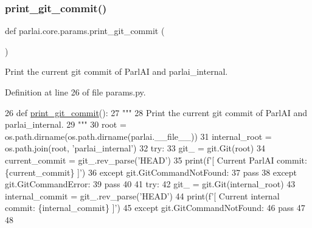 \mbox{\label{namespaceparlai_1_1core_1_1params_ac8624bf16ab6b2df0f2869f29a92c90b}} 
\subsubsection{\texorpdfstring{print\+\_\+git\+\_\+commit()}{print\_git\_commit()}}
{\footnotesize\ttfamily def parlai.\+core.\+params.\+print\+\_\+git\+\_\+commit (\begin{DoxyParamCaption}{ }\end{DoxyParamCaption})}

\begin{DoxyVerb}Print the current git commit of ParlAI and parlai_internal.
\end{DoxyVerb}
 

Definition at line 26 of file params.\+py.


\begin{DoxyCode}
26 \textcolor{keyword}{def }\hyperlink{namespaceparlai_1_1core_1_1params_ac8624bf16ab6b2df0f2869f29a92c90b}{print\_git\_commit}():
27     \textcolor{stringliteral}{"""}
28 \textcolor{stringliteral}{    Print the current git commit of ParlAI and parlai\_internal.}
29 \textcolor{stringliteral}{    """}
30     root = os.path.dirname(os.path.dirname(parlai.\_\_file\_\_))
31     internal\_root = os.path.join(root, \textcolor{stringliteral}{'parlai\_internal'})
32     \textcolor{keywordflow}{try}:
33         git\_ = git.Git(root)
34         current\_commit = git\_.rev\_parse(\textcolor{stringliteral}{'HEAD'})
35         print(f\textcolor{stringliteral}{'[ Current ParlAI commit: \{current\_commit\} ]'})
36     \textcolor{keywordflow}{except} git.GitCommandNotFound:
37         \textcolor{keywordflow}{pass}
38     \textcolor{keywordflow}{except} git.GitCommandError:
39         \textcolor{keywordflow}{pass}
40 
41     \textcolor{keywordflow}{try}:
42         git\_ = git.Git(internal\_root)
43         internal\_commit = git\_.rev\_parse(\textcolor{stringliteral}{'HEAD'})
44         print(f\textcolor{stringliteral}{'[ Current internal commit: \{internal\_commit\} ]'})
45     \textcolor{keywordflow}{except} git.GitCommandNotFound:
46         \textcolor{keywordflow}{pass}
47 
48 
\end{DoxyCode}
\mbox{\label{namespaceparlai_1_1core_1_1params_a714c9ed20ecfb4f9d524ccbe3510fecc}} 
